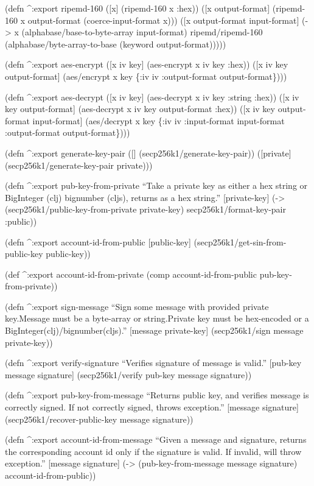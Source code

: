 \documentclass[
]{article}
\begin{document}
(defn \^{}:export ripemd-160 ({[}x{]} (ripemd-160 x :hex)) ({[}x
output-format{]} (ripemd-160 x output-format (coerce-input-format x)))
({[}x output-format input-format{]} (-\textgreater{} x
(alphabase/base-to-byte-array input-format) ripemd/ripemd-160
(alphabase/byte-array-to-base (keyword output-format)))))

(defn \^{}:export aes-encrypt ({[}x iv key{]} (aes-encrypt x iv key
:hex)) ({[}x iv key output-format{]} (aes/encrypt x key \{:iv iv
:output-format output-format\})))

(defn \^{}:export aes-decrypt ({[}x iv key{]} (aes-decrypt x iv key
:string :hex)) ({[}x iv key output-format{]} (aes-decrypt x iv key
output-format :hex)) ({[}x iv key output-format input-format{]}
(aes/decrypt x key \{:iv iv :input-format input-format :output-format
output-format\})))

(defn \^{}:export generate-key-pair ({[}{]}
(secp256k1/generate-key-pair)) ({[}private{]}
(secp256k1/generate-key-pair private)))

(defn \^{}:export pub-key-from-private ``Take a private key as either a
hex string or BigInteger (clj) bignumber (cljs), returns as a hex
string.'' {[}private-key{]} (-\textgreater{}
(secp256k1/public-key-from-private private-key)
secp256k1/format-key-pair :public))

(defn \^{}:export account-id-from-public {[}public-key{]}
(secp256k1/get-sin-from-public-key public-key))

(def \^{}:export account-id-from-private (comp account-id-from-public
pub-key-from-private))

(defn \^{}:export sign-message ``Sign some message with provided private
key.\n  Message must be a byte-array or string.\n  Private key must be
hex-encoded or a BigInteger(clj)/bignumber(cljs).'' {[}message
private-key{]} (secp256k1/sign message private-key))

(defn \^{}:export verify-signature ``Verifies signature of message is
valid.'' {[}pub-key message signature{]} (secp256k1/verify pub-key
message signature))

(defn \^{}:export pub-key-from-message ``Returns public key, and
verifies message is correctly signed. If not correctly signed, throws
exception.'' {[}message signature{]} (secp256k1/recover-public-key
message signature))

(defn \^{}:export account-id-from-message ``Given a message and
signature, returns the corresponding account id only if the signature is
valid. If invalid, will throw exception.'' {[}message signature{]}
(-\textgreater{} (pub-key-from-message message signature)
account-id-from-public))
\end{document}
